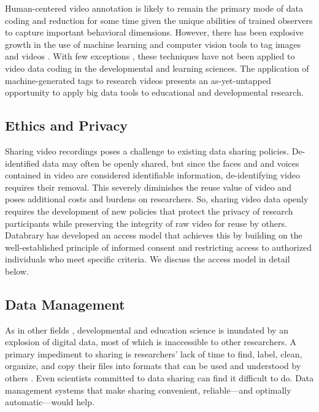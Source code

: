 \documentclass[letterpaper,man,apacite]{apa6}
\begin{document}
Human-centered video annotation is likely to remain the primary mode of data coding and reduction for some time given the unique abilities of trained observers to capture important behavioral dimensions.
However, there has been explosive growth in the use of machine learning and computer vision tools to tag images and videos \cite{Google2014}
. 
With few exceptions \cite{Amso2014,ChenYu2013,Raudies2014,Fathi2012}, 
these techniques have not been applied to video data coding in the developmental and learning sciences. 
The application of machine-generated tags to research videos presents an as-yet-untapped opportunity to apply big data tools to educational and developmental research.

\subsection{Ethics and Privacy}

Sharing video recordings poses a challenge to existing data sharing policies.
De-identified data \cite{HHS} 
may often be openly shared, but since the faces and and voices contained in video are considered identifiable information, de-identifying video requires their removal.
This severely diminishes the reuse value of video and poses additional costs and burdens on researchers.
So, sharing video data openly requires the development of new policies that protect the privacy of research participants while preserving the integrity of raw video for reuse by others.
Databrary has developed an access model that achieves this by building on the well-established principle of informed consent and restricting access to authorized individuals who meet specific criteria.
We discuss the access model in detail below.

\subsection{Data Management}

As in other fields \cite{Overpeck2011}, developmental and education science is inundated by an explosion of digital data, most of which is inaccessible to other researchers.
A primary impediment to sharing is researchers’ lack of time to find, label, clean, organize, and copy their files into formats that can be used and understood by others \cite{Ascoli2006}. 
Even scientists committed to data sharing can find it difficult to do. 
Data management systems that make sharing convenient, reliable—and optimally automatic—would help.
\end{document}
